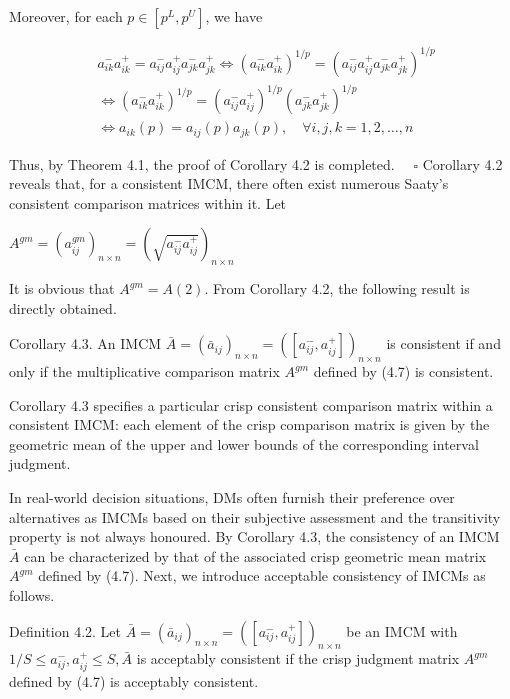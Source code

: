 \documentclass[10pt]{article}
\begin{document}
Moreover, for each $p \in\left[p^{L}, p^{U}\right]$, we have

$$
\begin{aligned}
& a_{i k}^{-} a_{i k}^{+}=a_{i j}^{-} a_{i j}^{+} a_{j k}^{-} a_{j k}^{+} \Leftrightarrow\left(a_{i k}^{-} a_{i k}^{+}\right)^{1 / p}=\left(a_{i j}^{-} a_{i j}^{+} a_{j k}^{-} a_{j k}^{+}\right)^{1 / p} \\
& \Leftrightarrow\left(a_{i k}^{-} a_{i k}^{+}\right)^{1 / p}=\left(a_{i j}^{-} a_{i j}^{+}\right)^{1 / p}\left(a_{j k}^{-} a_{j k}^{+}\right)^{1 / p} \\
& \Leftrightarrow a_{i k}(p)=a_{i j}(p) a_{j k}(p), \quad \forall i, j, k=1,2, \ldots, n
\end{aligned}
$$

Thus, by Theorem 4.1, the proof of Corollary 4.2 is completed. $\quad \square$ Corollary 4.2 reveals that, for a consistent IMCM, there often exist numerous Saaty's consistent comparison matrices within it. Let

$A^{g m}=\left(a_{i j}^{g m}\right)_{n \times n}=\left(\sqrt{a_{i j}^{-} a_{i j}^{+}}\right)_{n \times n}$

It is obvious that $A^{g m}=A(2)$. From Corollary 4.2, the following result is directly obtained.

Corollary 4.3. An IMCM $\bar{A}=\left(\bar{a}_{i j}\right)_{n \times n}=\left(\left[a_{i j}^{-}, a_{i j}^{+}\right]\right)_{n \times n}$ is consistent if and only if the multiplicative comparison matrix $A^{g m}$ defined by (4.7) is consistent.

Corollary 4.3 specifies a particular crisp consistent comparison matrix within a consistent IMCM: each element of the crisp comparison matrix is given by the geometric mean of the upper and lower bounds of the corresponding interval judgment.

In real-world decision situations, DMs often furnish their preference over alternatives as IMCMs based on their subjective assessment and the transitivity property is not always honoured. By Corollary 4.3, the consistency of an IMCM $\bar{A}$ can be characterized by that of the associated crisp geometric mean matrix $A^{g m}$ defined by (4.7). Next, we introduce acceptable consistency of IMCMs as follows.

Definition 4.2. Let $\bar{A}=\left(\bar{a}_{i j}\right)_{n \times n}=\left(\left[a_{i j}^{-}, a_{i j}^{+}\right]\right)_{n \times n}$ be an IMCM with $1 / S \leq a_{i j}^{-}, a_{i j}^{+} \leq S, \bar{A}$ is acceptably consistent if the crisp judgment matrix $A^{g m}$ defined by (4.7) is acceptably consistent.
\end{document}
